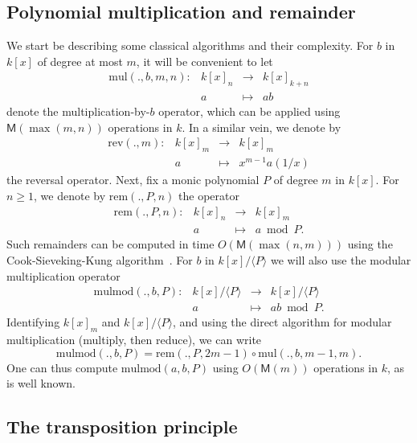 \documentclass{sig-alternate}
\def\M {\ensuremath{\mathsf{M}}}
\def\mul {\ensuremath{\mathrm{mul}}}
\def\rem {\ensuremath{\mathrm{rem}}}
\def\mulmod {\ensuremath{\mathrm{mulmod}}}
\def\rev {\ensuremath{\mathrm{rev}}}
\newcommand{\ang}[1]{\langle#1\rangle}
\begin{document}

\subsection{Polynomial multiplication and remainder}

We start be describing some classical algorithms and their complexity.
For $b$ in $k[x]$ of degree at most $m$, it will be convenient to let
$$
\begin{array}{cccc}
\mul(.,b,m,n): &k[x]_n& \to &k[x]_{k+n}\\
& a & \mapsto & ab
\end{array}$$ 
denote the multiplication-by-$b$ operator, which can be applied using
$\M(\max(m,n))$ operations in $k$. In a similar vein, we denote by
$$
\begin{array}{cccc}
\rev(.,m): &k[x]_m &\to& k[x]_m  \\
& a & \mapsto & x^{m-1} a(1/x)
\end{array}$$ the reversal operator. 
Next, fix a monic polynomial $P$ of degree $m$ in $k[x]$. For $n \ge 1$, we denote by
$\rem(.,P,n)$ the operator
$$
\begin{array}{cccc}
\rem(.,P,n): &k[x]_n& \to &k[x]_{m}\\
& a & \mapsto & a \bmod P.
\end{array}$$ 
Such remainders can be computed in time $O(\M(\max(n,m)))$ using the
Cook-Sieveking-Kung algorithm~\cite[Chapter~9]{vzGG}. For $b$
in $k[x]/\ang{P}$ we will also use the modular multiplication
operator
$$\begin{array}{cccc} \mulmod(.,b,P): & k[x]/\ang{P} & \to
  & k[x]/\ang{P}\\ & a & \mapsto & ab \bmod P.
\end{array}$$ 
Identifying $k[x]_m$ and $k[x]/\ang{P}$, and using the
direct algorithm for modular multiplication (multiply, then reduce),
we can write 
\begin{equation}
  \label{eq:mulmod}
  \mulmod(.,b,P) = \rem(.,P,2m-1) \circ \mul(.,b,m-1,m).
\end{equation}
One can thus compute $\mulmod(a,b,P)$ using $O(\M(m))$ operations in
$k$, as is well known.


\subsection{The transposition principle}
\label{sec:algor-dual-basis}
\end{document}
